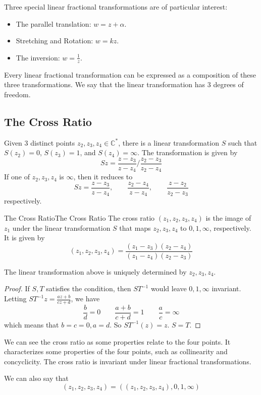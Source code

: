 \documentclass[../main.tex]{subfiles}
\begin{document}
Three special linear fractional transformations are of particular interest:
\begin{itemize}
\item The parallel translation: $w=z+\alpha$.
\item Stretching and Rotation: $w = kz$.
\item The inversion: $w = \frac{1}{z}$.
\end{itemize}
Every linear fractional transformation can be expressed as a composition of these three transformations. We say that the linear transformation has 3 degrees of freedom.

\subsection{The Cross Ratio}
Given 3 distinct points $z_2,z_3,z_4\in \mathbb{C}^*$, there is a linear transformation $S$ such that $S(z_2)=0$, $S(z_3)=1$, and $S(z_4)=\infty$. The transformation is given by
\begin{equation}
	Sz = \frac{z-z_3}{z-z_4} / \frac{z_2-z_3}{z_2-z_4}
\end{equation}
If one of $z_2,z_3,z_4$ is $\infty $, then it reduces to
\begin{equation}
	Sz = \frac{z-z_3}{z-z_4}, \qquad \frac{z_2-z_4}{z-z_4}, \qquad \frac{z-z_2}{z_2-z_3}
\end{equation}
respectively.

\begin{definition}{The Cross Ratio}{The Cross Ratio}
The cross ratio $(z_1,z_2,z_3,z_4)$ is the image of $z_1$ under the linear transformation $S$ that maps $z_2,z_3,z_4$ to $0,1,\infty $, respectively. It is given by
\begin{equation}
	(z_1,z_2,z_3,z_4) = \frac{(z_1-z_3)(z_2-z_4)}{(z_1-z_4)(z_2-z_3)}
\end{equation}
\end{definition}

\begin{remark}
The linear transformation above is uniquely determined by $z_2,z_3,z_4$.
\begin{proof}
If $S,T$ satisfies the condition, then $ST^{-1}$ would leave $0,1,\infty $ invariant. Letting $\displaystyle ST^{-1}z = \frac{az+b}{cz+d}$, we have
\begin{equation*}
	\frac{b}{d} = 0 \qquad \frac{a+b}{c+d} = 1 \qquad \frac{a}{c} = \infty
\end{equation*}
which means that $b=c=0,a=d$. So $ST^{-1}(z) = z$. $S=T$.
\end{proof}

We can see the cross ratio as some properties relate to the four points. It characterizes some properties of the four points, such as collinearity and concyclicity. The cross ratio is invariant under linear fractional transformations.

We can also say that
\begin{equation*}
	(z_1,z_2,z_3,z_4) = ((z_1,z_2,z_3,z_4), 0, 1, \infty )
\end{equation*}
\end{remark}
\end{document}
